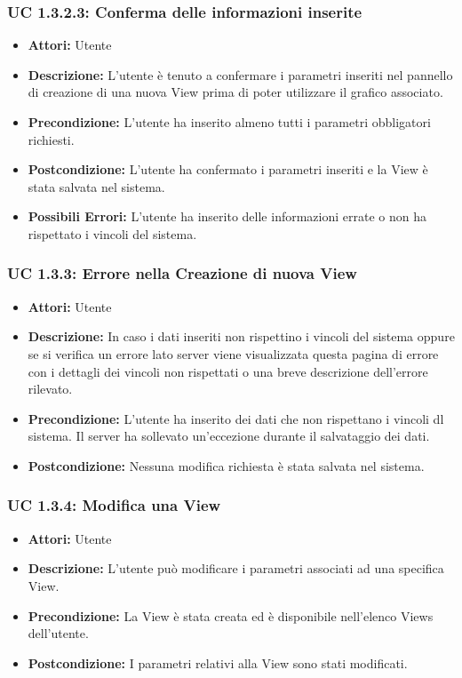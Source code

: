 \subsubsection{UC 1.3.2.3: Conferma delle informazioni inserite}

\begin{itemize}
    \item \textbf{Attori:} Utente
    \item \textbf{Descrizione:} L'utente è tenuto a confermare i parametri inseriti nel pannello di creazione di una nuova View prima di poter utilizzare il grafico associato.
    \item \textbf{Precondizione:} L'utente ha inserito almeno tutti i parametri obbligatori richiesti.
    \item \textbf{Postcondizione:} L'utente ha confermato i parametri inseriti e la View è stata salvata nel sistema.
    \item \textbf{Possibili Errori:} L'utente ha inserito delle informazioni errate o non ha rispettato i vincoli del sistema.
\end{itemize}

\subsubsection{UC 1.3.3: Errore nella Creazione di nuova View}

\begin{itemize}
    \item \textbf{Attori:} Utente
    \item \textbf{Descrizione:} In caso i dati inseriti non rispettino i vincoli del sistema oppure se si verifica un errore lato server viene visualizzata questa pagina di errore con i dettagli dei vincoli non rispettati o una breve descrizione dell'errore rilevato.
    \item \textbf{Precondizione:} L'utente ha inserito dei dati che non rispettano i vincoli dl sistema. Il server ha sollevato un'eccezione durante il salvataggio dei dati.
    \item \textbf{Postcondizione:} Nessuna modifica richiesta è stata salvata nel sistema.
\end{itemize}

\subsubsection{UC 1.3.4: Modifica una View}

\begin{itemize}
    \item \textbf{Attori:} Utente
    \item \textbf{Descrizione:} L'utente può modificare i parametri associati ad una specifica View.
    \item \textbf{Precondizione:} La View è stata creata ed è disponibile nell'elenco Views dell'utente.
    \item \textbf{Postcondizione:} I parametri relativi alla View sono stati modificati.
\end{itemize}

